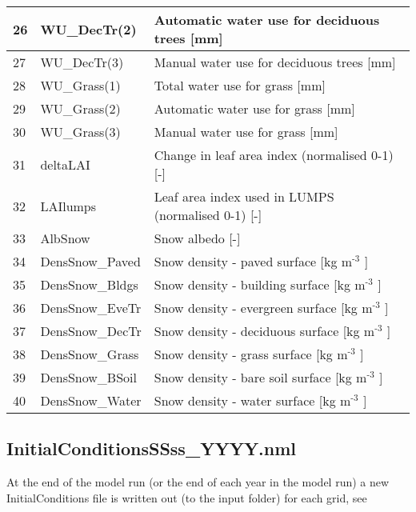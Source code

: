 \documentclass[letterpaper,10pt,english]{sphinxmanual}
\begin{document}
\begin{savenotes}
\begin{longtable}{|l|l|l|}
\\
\hline
26
&
WU\_DecTr(2)
&
Automatic water use for deciduous trees {[}mm{]}
\\
\hline
27
&
WU\_DecTr(3)
&
Manual water use for deciduous trees {[}mm{]}
\\
\hline
28
&
WU\_Grass(1)
&
Total water use for grass {[}mm{]}
\\
\hline
29
&
WU\_Grass(2)
&
Automatic water use for grass {[}mm{]}
\\
\hline
30
&
WU\_Grass(3)
&
Manual water use for grass {[}mm{]}
\\
\hline
31
&
deltaLAI
&
Change in leaf area index (normalised 0-1) {[}-{]}
\\
\hline
32
&
LAIlumps
&
Leaf area index used in LUMPS (normalised 0-1) {[}-{]}
\\
\hline
33
&
AlbSnow
&
Snow albedo {[}-{]}
\\
\hline
34
&
DensSnow\_Paved
&
Snow density - paved surface {[}kg m$^{\text{-3}}$ {]}
\\
\hline
35
&
DensSnow\_Bldgs
&
Snow density - building surface {[}kg m$^{\text{-3}}$ {]}
\\
\hline
36
&
DensSnow\_EveTr
&
Snow density - evergreen surface {[}kg m$^{\text{-3}}$ {]}
\\
\hline
37
&
DensSnow\_DecTr
&
Snow density - deciduous surface {[}kg m$^{\text{-3}}$ {]}
\\
\hline
38
&
DensSnow\_Grass
&
Snow density - grass surface {[}kg m$^{\text{-3}}$ {]}
\\
\hline
39
&
DensSnow\_BSoil
&
Snow density - bare soil surface {[}kg m$^{\text{-3}}$ {]}
\\
\hline
40
&
DensSnow\_Water
&
Snow density - water surface {[}kg m$^{\text{-3}}$ {]}
\\
\hline
\end{longtable}\sphinxatlongtableend\end{savenotes}


\subsection{InitialConditionsSSss\_YYYY.nml}
\label{\detokenize{output_files/output_files:initialconditionsssss-yyyy-nml}}\label{\detokenize{output_files/output_files:id2}}
At the end of the model run (or the end of each year in the model run) a
new InitialConditions file is written out (to the input folder) for each
grid, see {\hyperref[\detokenize{input_files/Initial_Conditions/Initial_Conditions:initial-conditions}]{}}
\end{document}

